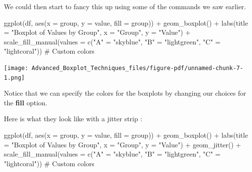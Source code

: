 \documentclass[
  letterpaper,
  DIV=11,
  numbers=noendperiod]{scrreprt}
\newenvironment{Shaded}{\begin{snugshade}}{\end{snugshade}}
\newcommand{\AttributeTok}[1]{\textcolor[rgb]{0.40,0.45,0.13}{#1}}
\newcommand{\CommentTok}[1]{\textcolor[rgb]{0.37,0.37,0.37}{#1}}
\newcommand{\FunctionTok}[1]{\textcolor[rgb]{0.28,0.35,0.67}{#1}}
\newcommand{\NormalTok}[1]{\textcolor[rgb]{0.00,0.23,0.31}{#1}}
\newcommand{\OtherTok}[1]{\textcolor[rgb]{0.00,0.23,0.31}{#1}}
\newcommand{\SpecialCharTok}[1]{\textcolor[rgb]{0.37,0.37,0.37}{#1}}
\newcommand{\StringTok}[1]{\textcolor[rgb]{0.13,0.47,0.30}{#1}}
\begin{document}
We could then start to fancy this up using some of the commands we saw
earlier.

\begin{Shaded}
\begin{Highlighting}[]
\FunctionTok{ggplot}\NormalTok{(df, }\FunctionTok{aes}\NormalTok{(}\AttributeTok{x =}\NormalTok{ group, }\AttributeTok{y =}\NormalTok{ value, }\AttributeTok{fill =}\NormalTok{ group)) }\SpecialCharTok{+}
  \FunctionTok{geom\_boxplot}\NormalTok{() }\SpecialCharTok{+}
  \FunctionTok{labs}\NormalTok{(}\AttributeTok{title =} \StringTok{"Boxplot of Values by Group"}\NormalTok{, }\AttributeTok{x =} \StringTok{"Group"}\NormalTok{, }\AttributeTok{y =} \StringTok{"Value"}\NormalTok{) }\SpecialCharTok{+}
  \FunctionTok{scale\_fill\_manual}\NormalTok{(}\AttributeTok{values =} \FunctionTok{c}\NormalTok{(}\StringTok{"A"} \OtherTok{=} \StringTok{"skyblue"}\NormalTok{, }\StringTok{"B"} \OtherTok{=} \StringTok{"lightgreen"}\NormalTok{, }\StringTok{"C"} \OtherTok{=} \StringTok{"lightcoral"}\NormalTok{))  }\CommentTok{\# Custom colors}
\end{Highlighting}
\end{Shaded}

\begin{center}
\texttt{[image: Advanced\_Boxplot\_Techniques\_files/figure-pdf/unnamed-chunk-7-1.png]}
\end{center}

Notice that we can specify the colors for the boxplots by changing our
choices for the \textbf{fill} option.

Here is what they look like with a jitter strip :

\begin{Shaded}
\begin{Highlighting}[]
\FunctionTok{ggplot}\NormalTok{(df, }\FunctionTok{aes}\NormalTok{(}\AttributeTok{x =}\NormalTok{ group, }\AttributeTok{y =}\NormalTok{ value, }\AttributeTok{fill =}\NormalTok{ group)) }\SpecialCharTok{+}
  \FunctionTok{geom\_boxplot}\NormalTok{() }\SpecialCharTok{+}
  \FunctionTok{labs}\NormalTok{(}\AttributeTok{title =} \StringTok{"Boxplot of Values by Group"}\NormalTok{, }\AttributeTok{x =} \StringTok{"Group"}\NormalTok{, }\AttributeTok{y =} \StringTok{"Value"}\NormalTok{) }\SpecialCharTok{+}
  \FunctionTok{geom\_jitter}\NormalTok{() }\SpecialCharTok{+}
  \FunctionTok{scale\_fill\_manual}\NormalTok{(}\AttributeTok{values =} \FunctionTok{c}\NormalTok{(}\StringTok{"A"} \OtherTok{=} \StringTok{"skyblue"}\NormalTok{, }\StringTok{"B"} \OtherTok{=} \StringTok{"lightgreen"}\NormalTok{, }\StringTok{"C"} \OtherTok{=} \StringTok{"lightcoral"}\NormalTok{))  }\CommentTok{\# Custom colors}
\end{Highlighting}
\end{Shaded}
\end{document}
